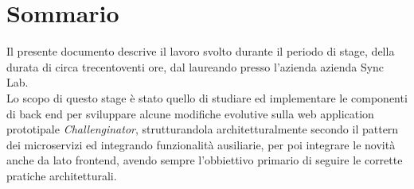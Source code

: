 
\cleardoublepage
{}
{}
\begingroup
\let\clearpage\relax
\let\cleardoublepage\relax
\let\cleardoublepage\relax

\chapter*{Sommario}

Il presente documento descrive il lavoro svolto durante il periodo di stage, della durata di circa trecentoventi ore,
dal laureando presso l'azienda azienda Sync Lab.\\
Lo scopo di questo stage è stato quello di studiare ed implementare le componenti di back end per sviluppare
alcune modifiche evolutive sulla web application prototipale \textit{Challenginator}, strutturandola architetturalmente secondo il pattern
dei microservizi ed integrando funzionalità ausiliarie, per poi integrare le novità anche da lato frontend, avendo sempre
l'obbiettivo primario di seguire le corrette pratiche architetturali.

\endgroup			

\vfill

